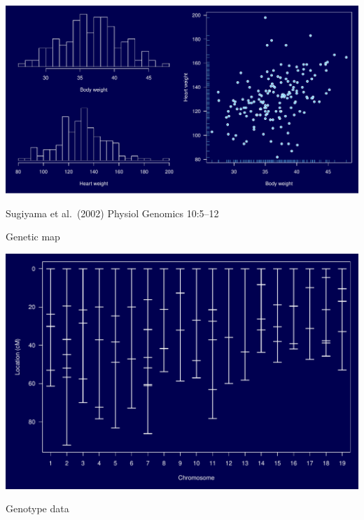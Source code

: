 \documentclass[12pt]{article}
\newcommand{\headsize}{\fontsize{35}{35} \selectfont}
\newcommand{\smallestsize}{\fontsize{18}{22} \selectfont}
\begin{document}
\vspace{30mm}

\centerline{\includegraphics{Figs/pheno.pdf}}

\vfill
\smallestsize
\color{myblue}
Sugiyama et al.\ (2002) Physiol Genomics 10:5--12


\newpage

\headsize \color{myyellow}
\hfill \begin{minipage}{5.75in}
\centering
Genetic map
\end{minipage}

\vfill

\centerline{\includegraphics{Figs/geneticmap.pdf}}

\newpage

\headsize \color{myyellow}
\hfill \begin{minipage}{5.75in}
\centering
Genotype data
\end{minipage}

\vfill
\end{document}
